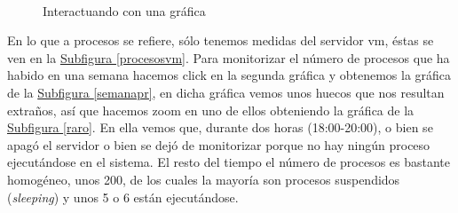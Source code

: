 \documentclass[10pt,a4paper,spanish]{article}
\numberwithin{equation}{section} %
\numberwithin{figure}{section} %
\numberwithin{table}{section} %
\begin{document}
\begin{figure}[!h]
\centering
\mbox {
\qquad
{}
}
\caption{Interactuando con una gráfica}
\label{grafica}
\end{figure}

En lo que a procesos se refiere, sólo tenemos medidas del servidor vm, éstas se ven en la \hyperref[procesosvm]{Subfigura \ref*{procesosvm}}. Para monitorizar el número de procesos que ha habido en una semana hacemos click en la segunda gráfica y obtenemos la gráfica de la \hyperref[semanapr]{Subfigura \ref*{semanapr}}, en dicha gráfica vemos unos huecos que nos resultan extraños, así que hacemos zoom en uno de ellos obteniendo la gráfica de la \hyperref[raro]{Subfigura \ref*{raro}}. En ella vemos que, durante dos horas (18:00-20:00), o bien se apagó el servidor o bien se dejó de monitorizar porque no hay ningún proceso ejecutándose en el sistema. El resto del tiempo el número de procesos es bastante homogéneo, unos 200, de los cuales la mayoría son procesos suspendidos (\textit{sleeping}) y unos 5 o 6 están ejecutándose.
\end{document}
